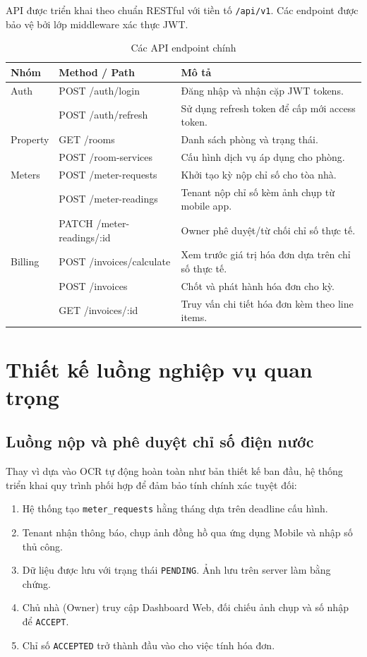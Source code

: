 API được triển khai theo chuẩn RESTful với tiền tố \texttt{/api/v1}. Các endpoint được bảo vệ bởi lớp middleware xác thực JWT.

\begin{table}[htbp]
\centering
\caption{Các API endpoint chính}
\label{tab:api}
\begin{tabularx}{\textwidth}{llX}
\toprule
\textbf{Nhóm} & \textbf{Method / Path} & \textbf{Mô tả} \\
\midrule
Auth & POST /auth/login & Đăng nhập và nhận cặp JWT tokens. \\
 & POST /auth/refresh & Sử dụng refresh token để cấp mới access token. \\
\midrule
Property & GET /rooms & Danh sách phòng và trạng thái. \\
 & POST /room-services & Cấu hình dịch vụ áp dụng cho phòng. \\
\midrule
Meters & POST /meter-requests & Khởi tạo kỳ nộp chỉ số cho tòa nhà. \\
 & POST /meter-readings & Tenant nộp chỉ số kèm ảnh chụp từ mobile app. \\
 & PATCH /meter-readings/:id & Owner phê duyệt/từ chối chỉ số thực tế. \\
\midrule
Billing & POST /invoices/calculate & Xem trước giá trị hóa đơn dựa trên chỉ số thực tế. \\
 & POST /invoices & Chốt và phát hành hóa đơn cho kỳ. \\
 & GET /invoices/:id & Truy vấn chi tiết hóa đơn kèm theo line items. \\
\bottomrule
\end{tabularx}
\end{table}

\section{Thiết kế luồng nghiệp vụ quan trọng}

\subsection{Luồng nộp và phê duyệt chỉ số điện nước}

Thay vì dựa vào OCR tự động hoàn toàn như bản thiết kế ban đầu, hệ thống triển khai quy trình phối hợp để đảm bảo tính chính xác tuyệt đối:
\begin{enumerate}
  \item Hệ thống tạo \texttt{meter\_requests} hằng tháng dựa trên deadline cấu hình.
  \item Tenant nhận thông báo, chụp ảnh đồng hồ qua ứng dụng Mobile và nhập số thủ công.
  \item Dữ liệu được lưu với trạng thái \texttt{PENDING}. Ảnh lưu trên server làm bằng chứng.
  \item Chủ nhà (Owner) truy cập Dashboard Web, đối chiếu ảnh chụp và số nhập để \texttt{ACCEPT}.
  \item Chỉ số \texttt{ACCEPTED} trở thành đầu vào cho việc tính hóa đơn.
\end{enumerate}

